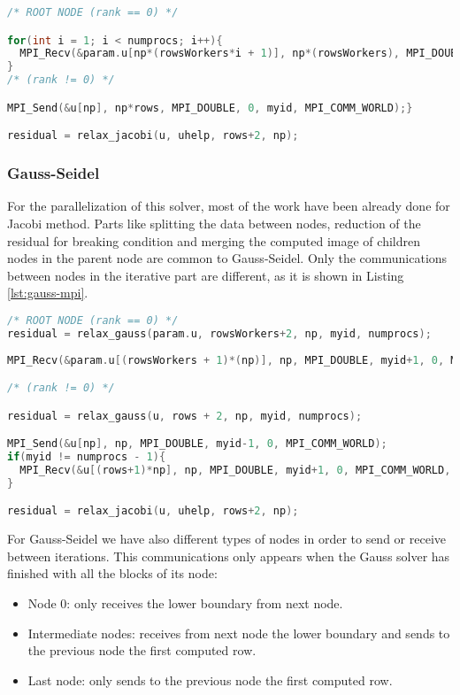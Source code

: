 \documentclass[a4paper, 10pt]{article}
\begin{document}
\begin{lstlisting}[language=c, caption={Communication of the computed image to the parent}]
/* ROOT NODE (rank == 0) */

for(int i = 1; i < numprocs; i++){
  MPI_Recv(&param.u[np*(rowsWorkers*i + 1)], np*(rowsWorkers), MPI_DOUBLE, i, i, MPI_COMM_WORLD, &status);
}
/* (rank != 0) */

MPI_Send(&u[np], np*rows, MPI_DOUBLE, 0, myid, MPI_COMM_WORLD);}

residual = relax_jacobi(u, uhelp, rows+2, np);
\end{lstlisting}


\subsubsection{Gauss-Seidel}

For the parallelization of this solver, most of the work have been already done for Jacobi method. Parts like splitting the data between nodes, reduction of the residual for breaking condition and merging the computed image of children nodes in the parent node are common to Gauss-Seidel. Only the communications between nodes in the iterative part are different, as it is shown in Listing \ref{lst:gauss-mpi}.

\begin{lstlisting}[language=c, caption={Communications between nodes Gauss-Seidel}, label={lst:gauss-mpi}]
/* ROOT NODE (rank == 0) */
residual = relax_gauss(param.u, rowsWorkers+2, np, myid, numprocs);
 
MPI_Recv(&param.u[(rowsWorkers + 1)*(np)], np, MPI_DOUBLE, myid+1, 0, MPI_COMM_WORLD, &status);

/* (rank != 0) */

residual = relax_gauss(u, rows + 2, np, myid, numprocs);   

MPI_Send(&u[np], np, MPI_DOUBLE, myid-1, 0, MPI_COMM_WORLD);
if(myid != numprocs - 1){
  MPI_Recv(&u[(rows+1)*np], np, MPI_DOUBLE, myid+1, 0, MPI_COMM_WORLD, &status);
}

residual = relax_jacobi(u, uhelp, rows+2, np);
\end{lstlisting}

For Gauss-Seidel we have also different types of nodes in order to send or receive between iterations. This communications only appears when the Gauss solver has finished with all the blocks of its node:

\begin{itemize}
  \item Node 0: only receives the lower boundary from next node.
  \item Intermediate nodes: receives from next node the lower boundary and sends to the previous node the first computed row.
  \item Last node: only sends to the previous node the first computed row.
\end{itemize}
\end{document}
